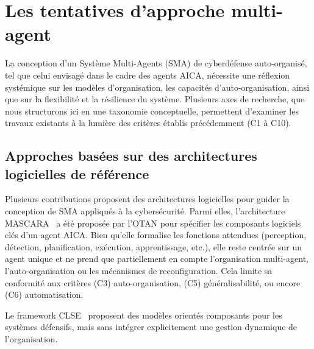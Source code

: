\documentclass[ twoside,openright,titlepage,numbers=noenddot,headinclude,%
                footinclude=true,cleardoublepage=empty,abstractoff, %
                BCOR=5mm,paper=a4,fontsize=11pt,%
                french,american,%
                ]{scrreprt}
\begin{document}
\section{Les tentatives d'approche multi-agent}\label{sec:sma-conception-aica}

La conception d'un Système Multi-Agents (SMA) de cyberdéfense auto-organisé, tel que celui envisagé dans le cadre des agents AICA, nécessite une réflexion systémique sur les modèles d'organisation, les capacités d'auto-organisation, ainsi que sur la flexibilité et la résilience du système. Plusieurs axes de recherche, que nous structurons ici en une taxonomie conceptuelle, permettent d'examiner les travaux existants à la lumière des critères établis précédemment (C1 à C10).

\subsection*{Approches basées sur des architectures logicielles de référence}

Plusieurs contributions proposent des architectures logicielles pour guider la conception de SMA appliqués à la cybersécurité. Parmi elles, l'architecture MASCARA~\cite{Kott2023} a été proposée par l'OTAN pour spécifier les composants logiciels clés d'un agent AICA. Bien qu'elle formalise les fonctions attendues (perception, détection, planification, exécution, apprentissage, etc.), elle reste centrée sur un agent unique et ne prend que partiellement en compte l'organisation multi-agent, l'auto-organisation ou les mécanismes de reconfiguration. Cela limite sa conformité aux critères (C3) auto-organisation, (C5) généralisabilité, ou encore (C6) automatisation.

Le framework CLSE~\cite{Hammar2023} proposent des modèles orientés composants pour les systèmes défensifs, mais sans intégrer explicitement une gestion dynamique de l'organisation.
\end{document}
